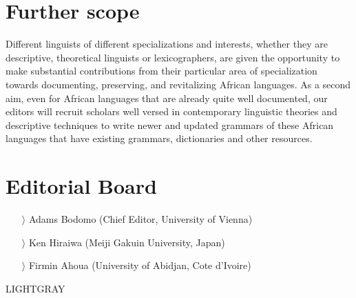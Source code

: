 \documentclass[
notumble,
nofoldmark,
]{leaflet}
\begin{document}
 
{
    \section{Further scope}    

Different linguists of different specializations and interests, whether they are descriptive, theoretical linguists or lexicographers, are given the opportunity to make substantial contributions from their particular area of specialization towards documenting, preserving, and revitalizing African languages. 
As a second aim, even for African languages that are already quite well documented, our editors will recruit scholars well versed in contemporary linguistic theories and descriptive techniques to write newer and updated grammars of these African languages that have existing grammars, dictionaries and other resources.

    \section{Editorial Board}    
\raggedright
    \begin{itemize}
    \item[$\rangle$] Adams Bodomo (Chief Editor, University of Vienna)
    \item[$\rangle$]Ken Hiraiwa (Meiji Gakuin University, Japan)
    \item[$\rangle$]Firmin Ahoua (University of Abidjan, Cote d'Ivoire)
    \end{itemize}
     }{LIGHTGRAY}
 
\end{document}
